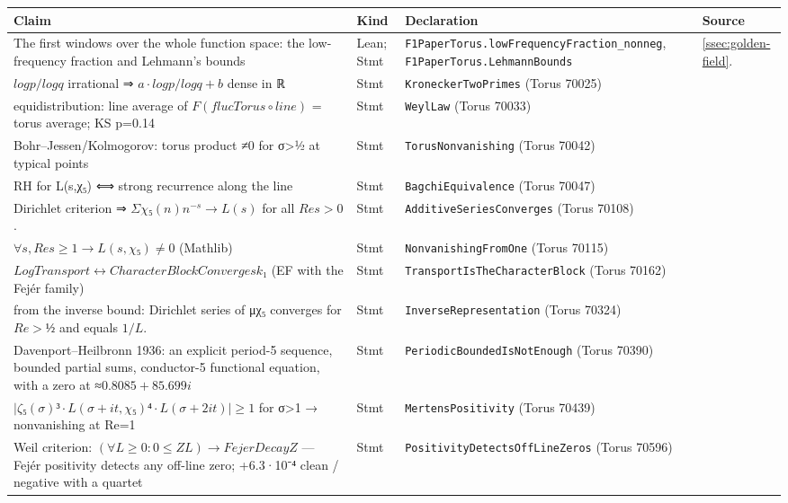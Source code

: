 {\scriptsize\setlength{\tabcolsep}{3pt}
\begin{longtable}{>{\raggedright\arraybackslash}p{}>{\raggedright\arraybackslash}p{}>{\raggedright\arraybackslash}p{}>{\raggedright\arraybackslash}p{}}
\toprule Claim & Kind & Declaration & Source\\\midrule\endhead
The first windows over the whole function space: the low-frequency fraction and Lehmann's bounds & Lean; Stmt & \texttt{F1PaperTorus.lowFrequencyFraction\_nonneg}, \texttt{F1PaperTorus.LehmannBounds} & \cref{ssec:golden-field}.\\
$log p/log q$ irrational ⇒ ${a·log p/log q+b}$ dense in ℝ & Stmt & \texttt{KroneckerTwoPrimes} (Torus \textbullet{} 70025) & \\
equidistribution: line average of $F(flucTorus∘line)$ = torus average; KS p=0.14 & Stmt & \texttt{WeylLaw} (Torus \textbullet{} 70033) & \\
Bohr–Jessen/Kolmogorov: torus product ≠0 for σ>½ at typical points & Stmt & \texttt{TorusNonvanishing} (Torus \textbullet{} 70042) & \\
RH for L(s,χ₅) ⟺ strong recurrence along the line & Stmt & \texttt{BagchiEquivalence} (Torus \textbullet{} 70047) & \\
Dirichlet criterion ⇒ $Σχ₅(n)n^{−s} → L(s)$ for all $Re s>0$. & Stmt & \texttt{AdditiveSeriesConverges} (Torus \textbullet{} 70108) & \\
$∀s, Re s≥1 → L(s,χ₅)≠0$ (Mathlib) & Stmt & \texttt{NonvanishingFromOne} (Torus \textbullet{} 70115) & \\
$LogTransport ↔ CharacterBlockConverges k₁$ (EF with the Fejér family) & Stmt & \texttt{TransportIsTheCharacterBlock} (Torus \textbullet{} 70162) & \\
from the inverse bound: Dirichlet series of μχ₅ converges for $Re>½$ and equals $1/L$. & Stmt & \texttt{InverseRepresentation} (Torus \textbullet{} 70324) & \\
Davenport–Heilbronn 1936: an explicit period-5 sequence, bounded partial sums, conductor-5 functional equation, with a zero at ≈$0.8085+85.699i$ & Stmt & \texttt{PeriodicBoundedIsNotEnough} (Torus \textbullet{} 70390) & \\
$|ζ₅(σ)³·L(σ+it,χ₅)⁴·L(σ+2it)| ≥ 1$ for σ>1 → nonvanishing at Re=1 & Stmt & \texttt{MertensPositivity} (Torus \textbullet{} 70439) & \\
Weil criterion: $(∀L≥0: 0≤Z L) → FejerDecay Z$ — Fejér positivity detects any off-line zero; +6.3·10⁻⁴ clean / negative with a quartet & Stmt & \texttt{PositivityDetectsOffLineZeros} (Torus \textbullet{} 70596) & \\

\end{longtable}}
